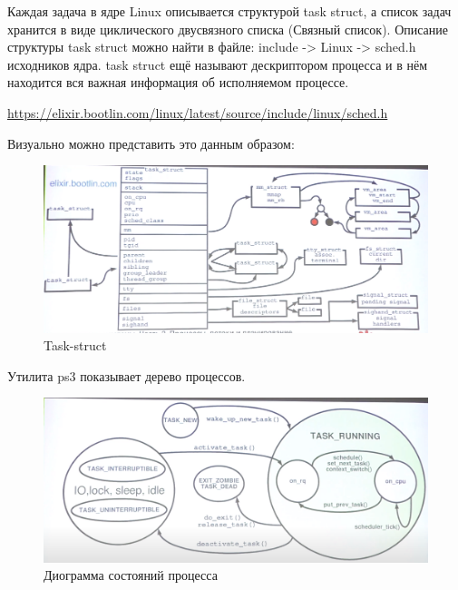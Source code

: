\documentclass[bachelor, och, book]{SCWorks}
\theoremstyle{remark}
\begin{document}
    Каждая задача в ядре Linux описывается структурой task struct, а список задач хранится в виде циклического двусвязного списка (Связный список). Описание структуры task struct можно найти в файле: include -> Linux -> sched.h исходников ядра. task struct ещё называют дескриптором процесса и в нём находится вся важная информация об исполняемом процессе.


    \href{https://elixir.bootlin.com/linux/latest/source/include/linux/sched.h}{https://elixir.bootlin.com/linux/latest/source/include/linux/sched.h}

    Визуально можно представить это данным образом: 

    \begin{figure}[H]
        \begin{center}
            \includegraphics[scale=0.50]{res/task-struckt.png}
            \caption{Task-struct}
        \end{center}
    \end{figure}

    Утилита ps3 показывает дерево процессов.

    \begin{figure}[H]
        \begin{center}
            \includegraphics[scale=0.50]{res/state-proces-diagram.png}
            \caption{Диограмма состояний процесса}
        \end{center}
    \end{figure}
\end{document}
